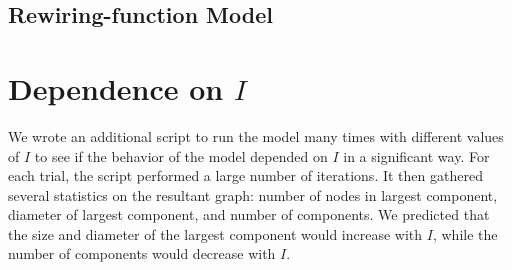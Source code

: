 \documentclass[a4paper,10pt]{article}
\begin{document}
\subsection{Rewiring-function Model}

\section{Dependence on $I$}

We wrote an additional script to run the model many times with different values of $I$ to see if the behavior of the model depended on $I$ in a significant way. For each trial, the script performed a large number of iterations. It then gathered several statistics on the resultant graph: number of nodes in largest component, diameter of largest component, and number of components. We predicted that the size and diameter of the largest component would increase with $I$, while the number of components would decrease with $I$. 
\end{document}
